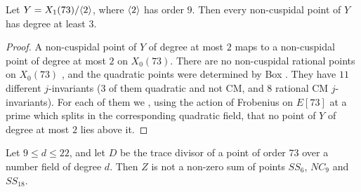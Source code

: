 \begin{lemma}\label{lem:Y73}
Let $Y=X_1(73)/\langle 2\rangle$, where $\langle 2\rangle$ has order $9$. Then every non-cuspidal point of $Y$ has degree at least $3$.
\end{lemma}

\begin{proof}
A non-cuspidal point of $Y$ of degree at most $2$ maps to a non-cuspidal point of degree at most $2$ on $X_0(73)$. There are no non-cuspidal rational points on $X_0(73)$ \cite[Theorem 1]{mazur78}, and the quadratic points were determined by Box \cite[Section 4.7]{Box}. They have $11$ different $j$-invariants ($3$ of them quadratic and not CM, and $8$ rational CM $j$-invariants). For each of them we , using the action of Frobenius on $E[73]$ at a prime which splits in the corresponding quadratic field, that no point of $Y$ of degree at most $2$ lies above it.
\end{proof}

\begin{proposition}\label{prop:73}
Let $9\leq d\leq 22$, and let $D$ be the trace divisor of a point of order $73$ over a number field of degree $d$. Then $Z$ is not a non-zero sum of points $SS_6$, $NC_9$ and $SS_{18}$.
\end{proposition}

